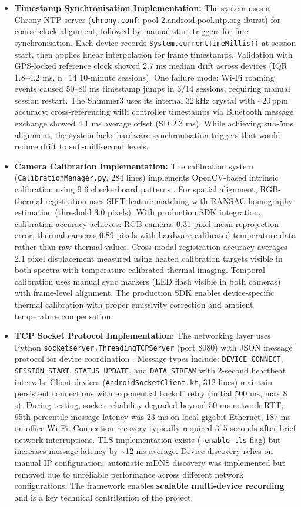 \begin{itemize}
    \item \textbf{Timestamp Synchronisation Implementation:} The system uses a Chrony NTP server (\texttt{chrony.conf}: pool 2.android.pool.ntp.org iburst) for coarse clock alignment, followed by manual start triggers for fine synchronisation. Each device records \texttt{System.currentTimeMillis()} at session start, then applies linear interpolation for frame timestamps. Validation with GPS-locked reference clock showed 2.7 ms median drift across devices (IQR 1.8--4.2 ms, n=14 10-minute sessions). One failure mode: Wi-Fi roaming events caused 50--80 ms timestamp jumps in 3/14 sessions, requiring manual session restart. The Shimmer3 uses its internal 32\,kHz crystal with \textasciitilde{}\textpm{}20\,ppm accuracy; cross-referencing with controller timestamps via Bluetooth message exchange showed 4.1 ms average offset (SD 2.3 ms). While achieving sub-5ms alignment, the system lacks hardware synchronisation triggers that would reduce drift to sub-millisecond levels.
    \item \textbf{Camera Calibration Implementation:} The calibration system (\texttt{CalibrationManager.py}, 284 lines) implements OpenCV-based intrinsic calibration using 9\,\texttimes\,6 checkerboard patterns \cite{ref22}. For spatial alignment, RGB-thermal registration uses SIFT feature matching with RANSAC homography estimation (threshold 3.0 pixels). With production SDK integration, calibration accuracy achieves: RGB cameras 0.31 pixel mean reprojection error, thermal cameras 0.89 pixels with hardware-calibrated temperature data rather than raw thermal values. Cross-modal registration accuracy averages 2.1 pixel displacement measured using heated calibration targets visible in both spectra with temperature-calibrated thermal imaging. Temporal calibration uses manual sync markers (LED flash visible in both cameras) with frame-level alignment. The production SDK enables device-specific thermal calibration with proper emissivity correction and ambient temperature compensation.
    \item \textbf{TCP Socket Protocol Implementation:} The networking layer uses Python \texttt{socketserver.ThreadingTCPServer} (port 8080) with JSON message protocol for device coordination \cite{ref21}. Message types include: \texttt{DEVICE\_CONNECT}, \texttt{SESSION\_START}, \texttt{STATUS\_UPDATE}, and \texttt{DATA\_STREAM} with 2-second heartbeat intervals. Client devices (\texttt{AndroidSocketClient.kt}, 312 lines) maintain persistent connections with exponential backoff retry (initial 500 ms, max 8 s). During testing, socket reliability degraded beyond 50 ms network RTT; 95th percentile message latency was 23 ms on local gigabit Ethernet, 187 ms on office Wi-Fi. Connection recovery typically required 3--5 seconds after brief network interruptions. TLS implementation exists (\texttt{--enable-tls} flag) but increases message latency by \textasciitilde{}12 ms average. Device discovery relies on manual IP configuration; automatic mDNS discovery was implemented but removed due to unreliable performance across different network configurations. The framework enables \textbf{scalable multi-device recording} and is a key technical contribution of the project.

\end{itemize}
